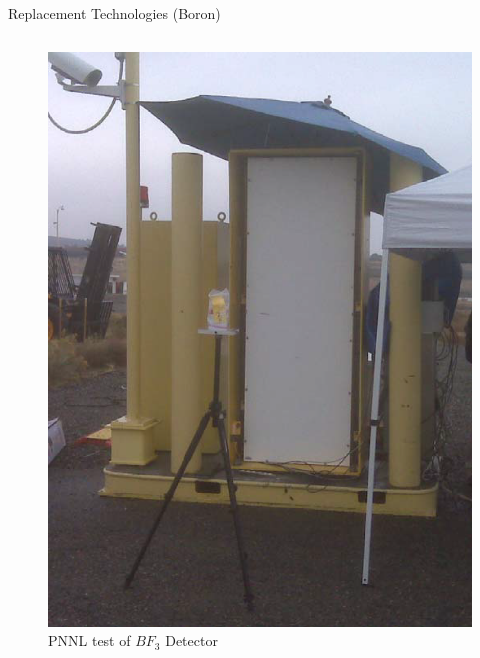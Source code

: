 \documentclass{beamer}
\begin{document}
\begin{frame}{Replacement Technologies (Boron)}
\begin{columns}[onlytextwidth]
\begin{column}{0.45\textwidth}
\begin{figure}
		\includegraphics[height=0.25\textheight]{images/BF3Test.eps}
		\caption{PNNL test of $BF_3$ Detector}
		\label{fig:BF3PNNLTest}
	\end{figure}
\end{column}
\end{columns}
\end{frame}
\end{document}
